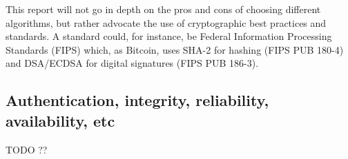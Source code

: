 This report will not go in depth on the pros and cons of choosing
different algorithms, but rather advocate the use of cryptographic
best practices and standards. A standard could, for instance, be
Federal Information Processing Standards (FIPS) which, as Bitcoin,
uses SHA-2 for hashing (FIPS PUB 180-4) and DSA/ECDSA for digital
signatures (FIPS PUB 186-3).


\subsection{Authentication, integrity, reliability, availability, etc}
TODO ??
